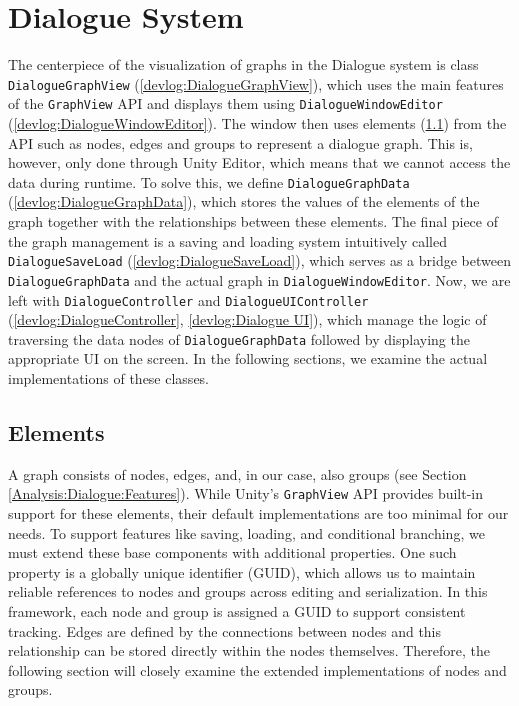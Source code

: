 \section{Dialogue System}
\label{DialogueSystem}
The centerpiece of the visualization of graphs in the Dialogue system is class \verb|DialogueGraphView| (\ref{devlog:DialogueGraphView}), which uses the main features of the \verb|GraphView| API and displays them using \verb|DialogueWindowEditor| (\ref{devlog:DialogueWindowEditor}). The window then uses elements (\ref{devlog:Elements}) from the API such as nodes, edges and groups to represent a dialogue graph. This is, however, only done through Unity Editor, which means that we cannot access the data during runtime. To solve this, we define \verb|DialogueGraphData| (\ref{devlog:DialogueGraphData}), which stores the values of the elements of the graph together with the relationships between these elements. The final piece of the graph management is a saving and loading system intuitively called \verb|DialogueSaveLoad| (\ref{devlog:DialogueSaveLoad}), which serves as a bridge between \verb|DialogueGraphData| and the actual graph in \verb|DialogueWindowEditor|. Now, we are left with \verb|DialogueController| and \verb|DialogueUIController| (\ref{devlog:DialogueController}, \ref{devlog:Dialogue UI}), which manage the logic of traversing the data nodes of \verb|DialogueGraphData| followed by displaying the appropriate UI on the screen. In the following sections, we examine the actual implementations of these classes.

\subsection{Elements}
\label{devlog:Elements}
A graph consists of nodes, edges, and, in our case, also groups (see Section \ref{Analysis:Dialogue:Features}). While Unity’s \verb|GraphView| API provides built-in support for these elements, their default implementations are too minimal for our needs. To support features like saving, loading, and conditional branching, we must extend these base components with additional properties. One such property is a globally unique identifier (GUID), which allows us to maintain reliable references to nodes and groups across editing and serialization. In this framework, each node and group is assigned a GUID to support consistent tracking. Edges are defined by the connections between nodes and this relationship can be stored directly within the nodes themselves. Therefore, the following section will closely examine the extended implementations of nodes and groups.



